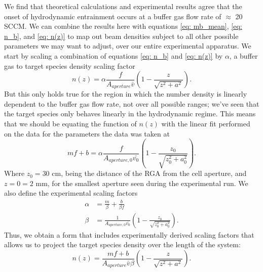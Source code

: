We find that theoretical calculations and experimental results agree that the onset of hydrodynamic entrainment occurs at a buffer gas flow rate of $\approx$ 20 SCCM. We can combine the results here with equations \ref{eq: mb_mean}, \ref{eq: n_b}, and \ref{eq: n(z)} to map out beam densities subject to all other possible parameters we may want to adjust, over our entire experimental apparatus. We start by scaling a combination of equations \ref{eq: n_b} and \ref{eq: n(z)} by $\alpha$, a buffer gas to target species density scaling factor
\begin{equation*}
	n(z) = \alpha\frac{f}{A_{aperture} \bar{v}}\left(1-\frac{z}{\sqrt{z^2+a^2}}\right).
\end{equation*}
But this only holds true for the region in which the number density is linearly dependent to the buffer gas flow rate, not over all possible ranges; we've seen that the target species only behaves linearly in the hydrodynamic regime. This means that we should be equating the function of $n(z)$ with the linear fit performed on the data for the parameters the data was taken at
\begin{equation*}
	mf+b = \alpha\frac{f}{A_{aperture, 0} \bar{v_0}}\left(1-\frac{z_0}{\sqrt{z_0^2+a_0^2}}\right) .
\end{equation*}
Where $z_0=30$ cm, being the distance of the RGA from the cell aperture, and $z=0=2$ mm, for the smallest aperture seen during the experimental run. We also define the experimental scaling factors
\begin{align*}
	\alpha & = \frac{m}{\beta}+\frac{b}{\beta f} \\
	\beta & = \frac{1}{A_{aperture, 0} \bar{v_0}}\left(1-\frac{z_0}{\sqrt{z_0^2+a_0^2}}\right).
\end{align*}
Thus, we obtain a form that includes experimentally derived scaling factors that allows us to project the target species density over the length of the system:
\begin{equation}
	n(z) = \frac{mf+b}{A_{aperture} \bar{v} \beta}\left(1-\frac{z}{\sqrt{z^2+a^2}}\right).
	\label{eq: experimental n(z)}
\end{equation}

